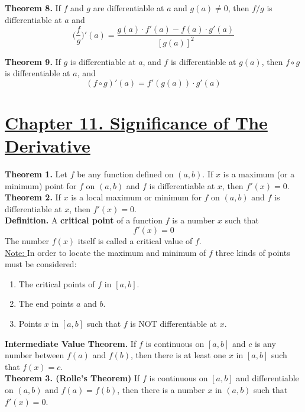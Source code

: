 \documentclass[10pt,letterpaper]{article}
\begin{document}
	
	\textbf{Theorem 8. } If $f$ and $g$ are differentiable at $a$ and $g(a) \neq 0$, then 
	$f/g$ is differentiable at $a$ and
	$$\bigg(\dfrac{f}{g}\bigg)'(a) = \dfrac{g(a) \cdot f'(a) - f(a) \cdot g'(a)}{[g(a)]^2}$$
	
	\textbf{Theorem 9. } If $g$ is differentiable at $a$, and $f$ is differentiable at $g(a)$,
	then $f \circ g$ is differentiable at $a$, and 
	$$(f \circ g)'(a) = f'(g(a)) \cdot g'(a)$$
	
	\section*{{\color{red}\underline{Chapter 11. Significance of The Derivative}}}

	\textbf{Theorem 1. } Let $f$ be any function defined on $(a, b)$. If $x$ is a maximum (or a minimum)
	point for $f$ on $(a, b)$ and $f$ is differentiable at $x$, then $f'(x) = 0$. \\
	
	\textbf{Theorem 2. } If $x$ is a local maximum or minimum for $f$ on $(a, b)$ and $f$ is 
	differentiable at $x$, then $f'(x) = 0$. \\
	
	\textbf{Definition. } A \textbf{critical point} of a function $f$ is a number $x$ such that
	$$f'(x) = 0$$
	The number $f(x)$ itself is called a critical value of $f$. \\
	
	\underline{Note: } In order to locate the maximum and minimum of $f$ three kinds of points
	must be considered: 
	\begin{enumerate}
		\item The critical points of $f$ in $[a, b]$.
		\item The end points $a$ and $b$.
		\item Points $x$ in $[a, b]$ such that $f$ is NOT differentiable at $x$.
	\end{enumerate}		
			
	\textbf{Intermediate Value Theorem. } If $f$ is continuous on $[a, b]$ and $c$ is any number
	between $f(a)$ and $f(b)$, then there is at least one $x$ in $[a, b]$ such that $f(x) = c$. \\
	
	\textbf{Theorem 3. (Rolle's Theorem)} If $f$ is continuous on $[a, b]$ and differentiable on $(a, b)$ and $f(a) = f(b)$, 		then there is a number $x$ in $(a, b)$ such that $f'(x) = 0$. \\
	
\end{document}
